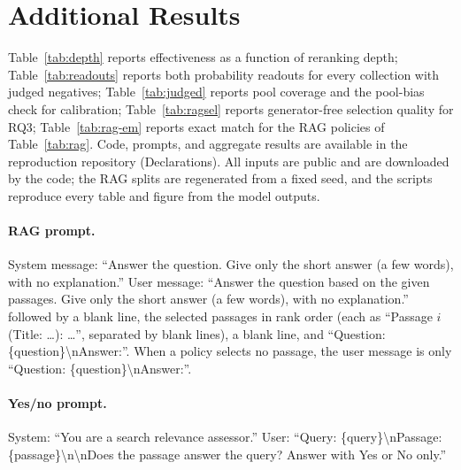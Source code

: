 \section{Additional Results}

Table~\ref{tab:depth} reports effectiveness as a function of reranking depth; Table~\ref{tab:readouts} reports both probability readouts for every collection with judged negatives; Table~\ref{tab:judged} reports pool coverage and the pool-bias check for calibration; Table~\ref{tab:ragsel} reports generator-free selection quality for RQ3; Table~\ref{tab:rag-em} reports exact match for the RAG policies of Table~\ref{tab:rag}.
Code, prompts, and aggregate results are available in the reproduction repository (Declarations). All inputs are public and are downloaded by the code; the RAG splits are regenerated from a fixed seed, and the scripts reproduce every table and figure from the model outputs.









\paragraph{RAG prompt.} System message: ``Answer the question. Give only the short answer (a few words), with no explanation.'' User message: ``Answer the question based on the given passages. Give only the short answer (a few words), with no explanation.'' followed by a blank line, the selected passages in rank order (each as ``Passage $i$ (Title: \dots): \dots'', separated by blank lines), a blank line, and ``Question: \{question\}\textbackslash nAnswer:''. When a policy selects no passage, the user message is only ``Question: \{question\}\textbackslash nAnswer:''.

\paragraph{Yes/no prompt.} System: ``You are a search relevance assessor.'' User: ``Query: \{query\}\textbackslash nPassage: \{passage\}\textbackslash n\textbackslash nDoes the passage answer the query? Answer with Yes or No only.''


